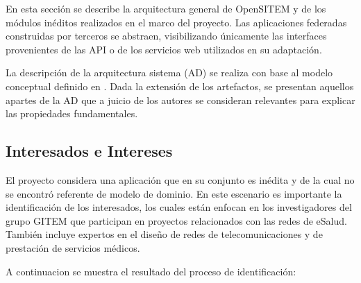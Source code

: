 En esta sección se describe la arquitectura general de OpenSITEM y de los módulos inéditos realizados en el marco del proyecto. Las aplicaciones federadas construidas por terceros se abstraen, visibilizando únicamente las interfaces provenientes de las API o de los servicios web utilizados en su adaptación. 

La descripción de la arquitectura sistema (AD) se realiza con base al modelo conceptual definido en \cite{ISO42010}. Dada la extensión de los artefactos, se presentan aquellos apartes de la AD que a juicio de los autores se consideran relevantes para explicar las propiedades fundamentales.

\subsection{Interesados e Intereses}

El proyecto considera una aplicación que en su conjunto es inédita y de la cual no se encontró referente de modelo de dominio. En este escenario es importante la identificación de los interesados, los cuales están enfocan en los investigadores del grupo GITEM que participan en proyectos relacionados con las redes de eSalud. También incluye expertos en el diseño de redes de telecomunicaciones y de prestación de servicios médicos.

A continuacion se muestra el resultado del proceso de identificación:


